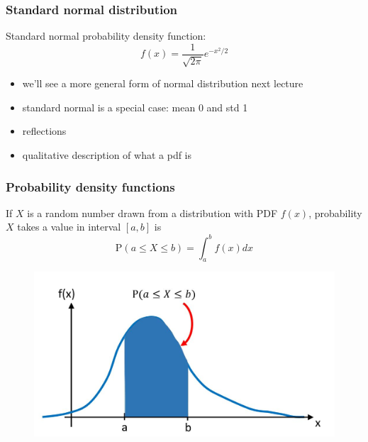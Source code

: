 \documentclass[english,14pt]{beamer}
\begin{document}

\begin{frame}[fragile]

\frametitle{Standard normal distribution}

Standard normal probability density function:
\[
\boxed{
f(x) = \frac{1}{\sqrt{2\pi}} e^{-x^2/2}}
\]

%

\begin{itemize}
	\item we'll see a more general form of normal distribution next lecture
	\item standard normal is a special case: mean 0 and std 1
	\item reflections
	\item qualitative description of what a pdf is
\end{itemize}

\end{frame}


\begin{frame}[fragile]

\frametitle{Probability density functions}

If $X$ is a random number drawn from a distribution with PDF $f(x)$, probability $X$ takes a value in interval $[a,b]$ is
\vspace*{-2mm}
\[
	\boxed{
\mathrm{P}(a \leq X \leq b) = \int_a^b f(x) dx}
\]
\vspace*{-5mm}
\begin{figure}[ht]
	\centering
	\includegraphics[width=.7\textwidth]{figures/genericPDF}
\end{figure}

\end{frame}
\end{document}
